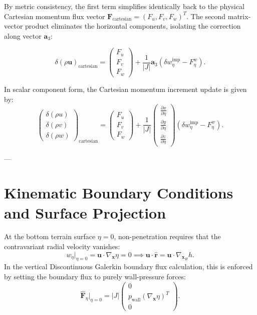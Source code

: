 \documentclass[11pt,a4paper]{article}
\begin{document}
By metric consistency, the first term simplifies identically back to the physical Cartesian momentum flux vector $\mathbf{F}_{\text{cartesian}} = (F_u, F_v, F_w)^T$. The second matrix-vector product eliminates the horizontal components, isolating the correction along vector $\boldsymbol{a}_3$:

\begin{equation}
\delta(\rho \boldsymbol{u})_{\text{cartesian}} = \begin{pmatrix} F_u \\[4pt] F_v \\[4pt] F_w \end{pmatrix} + \frac{1}{|J|} \boldsymbol{a}_3 \left( \delta w_\eta^{\text{imp}} - F_\eta^w \right).
\end{equation}

In scalar component form, the Cartesian momentum increment update is given by:
\begin{equation}
\begin{pmatrix} \delta(\rho u) \\[4pt] \delta(\rho v) \\[4pt] \delta(\rho w) \end{pmatrix}_{\text{cartesian}} = \begin{pmatrix} F_u \\[4pt] F_v \\[4pt] F_w \end{pmatrix} + \frac{1}{|J|} \begin{pmatrix} \frac{\partial x}{\partial \eta} \\[4pt] \frac{\partial y}{\partial \eta} \\[4pt] \frac{\partial z}{\partial \eta} \end{pmatrix} \left( \delta w_\eta^{\text{imp}} - F_\eta^w \right).
\end{equation}

---

\section{Kinematic Boundary Conditions and Surface Projection}

At the bottom terrain surface $\eta = 0$, non-penetration requires that the contravariant radial velocity vanishes:
\begin{equation}
w_\eta \big|_{\eta=0} = \boldsymbol{u} \cdot \nabla_{\boldsymbol{x}} \eta = 0 \implies \boldsymbol{u} \cdot \hat{\boldsymbol{r}} = \boldsymbol{u} \cdot \nabla_{\boldsymbol{x}_H} h.
\end{equation}
In the vertical Discontinuous Galerkin boundary flux calculation, this is enforced by setting the boundary flux to purely wall-pressure forces:
\begin{equation}
\hat{\mathbf{F}}_\eta \Big|_{\eta=0} = |J| \begin{pmatrix} 0 \\ p_{\text{wall}} (\nabla_{\boldsymbol{x}} \eta)^T \\ 0 \end{pmatrix}.
\end{equation}
\end{document}
